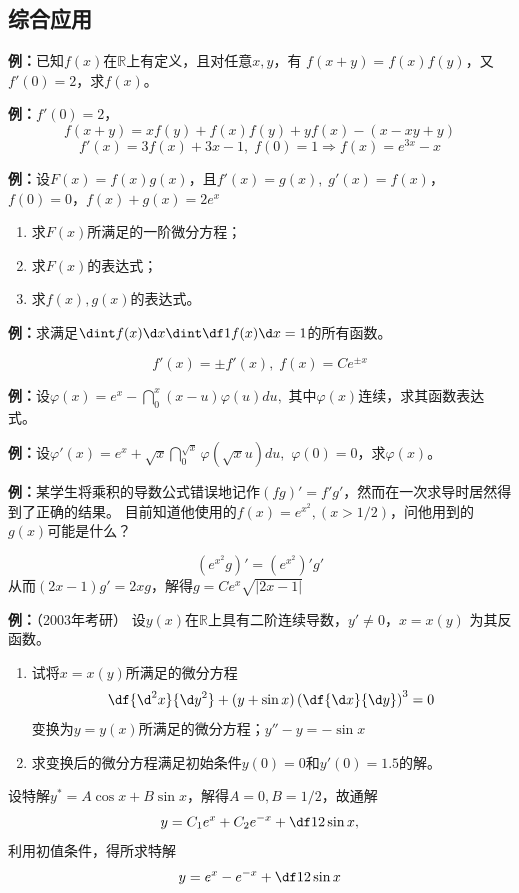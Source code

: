 \subsection{综合应用}

{\bf 例：}已知$f(x)$在$\mathbb{R}$上有定义，且对任意$x,y$，有
$f(x+y)=f(x)f(y)$，又$f'(0)=2$，求$f(x)$。

{\bf 例：}$f'(0)=2$，
$$f(x+y)=xf(y)+f(x)f(y)+yf(x)-(x-xy+y)$$
$$f'(x)=3f(x)+3x-1,\;f(0)=1\Rightarrow f(x)=e^{3x}-x$$

{\bf 例：}设$F(x)=f(x)g(x)$，且$f'(x)=g(x),\;g'(x)=f(x)$，
$f(0)=0$，$f(x)+g(x)=2e^x$
\begin{enumerate}[(1)]
  \setlength{\itemindent}{1cm}
  \item 求$F(x)$所满足的一阶微分方程；
  \item 求$F(x)$的表达式；
  \item 求$f(x),g(x)$的表达式。
\end{enumerate}

{\bf 例：}求满足$\dint f(x)\d x\dint\df1{f(x)}\d x=1$的所有函数。

$$f'(x)=\pm f'(x),\;f(x)=Ce^{\pm x}$$

{\bf 例：}设$\varphi(x)=e^x-\dint_0^x(x-u)\varphi(u)du,$
其中$\varphi(x)$连续，求其函数表达式。

{\bf 例：}设$\varphi'(x)=e^x+\sqrt x\dint_0^{\sqrt x}\varphi(\sqrt x u)du,$
$\varphi(0)=0$，求$\varphi(x)$。

{\bf 例：}某学生将乘积的导数公式错误地记作$(fg)'=f'g'$，然而在一次求导时居然得到了正确的结果。
目前知道他使用的$f(x)=e^{x^2},(x>1/2)$，问他用到的$g(x)$可能是什么？

$$\left(e^{x^2}g\right)'=\left(e^{x^2}\right)'g'$$
从而$(2x-1)g'=2xg$，解得$g=Ce^x\sqrt{|2x-1|}$

{\bf 例：}（2003年考研）
设$y(x)$在$\mathbb{R}$上具有二阶连续导数，$y'\ne 0$，$x=x(y)$
为其反函数。
\begin{enumerate}[(1)]
  \setlength{\itemindent}{1cm}
  \item 试将$x=x(y)$所满足的微分方程
  $$\df{\d^2x}{\d y^2}+(y+\sin x)\left(\df{\d x}{\d y}\right)^3=0$$
  变换为$y=y(x)$所满足的微分方程；\hfill$y''-y=-\sin x$
  \item 求变换后的微分方程满足初始条件$y(0)=0$和$y'(0)=1.5$的解。
\end{enumerate}
设特解$y^*=A\cos x+B\sin x$，解得$A=0,B=1/2$，故通解
$$y=C_1e^x+C_2e^{-x}+\df12\sin x,$$
利用初值条件，得所求特解
$$y=e^x-e^{-x}+\df12\sin x$$

\newpage

